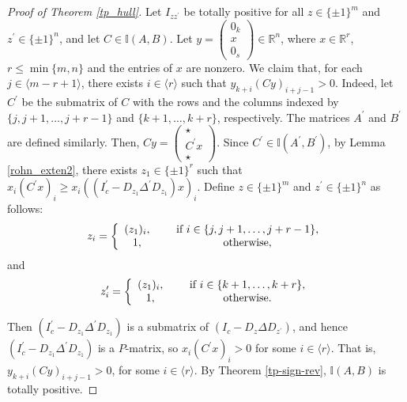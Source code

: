 \documentclass[11pt]{article}
\begin{document}
\begin{proof}[Proof of Theorem \ref{tp_hull}]
    Let $I_{z z^{'}}$ be totally positive for all $z\in \{ \pm 1 \}^m$ and $z^{\prime}\in \{ \pm 1 \}^n$, and let $C \in \mathbb{I}(A,B)$. Let $y = \begin{pmatrix}
    0_k\\x\\0_s
    \end{pmatrix} \in \mathbb{R}^n
    $, where $x \in \mathbb{R}^r$, $r\leq \min \{m,n\}$ and the entries of $x$ are nonzero. We claim that, for each $j \in \langle m-r+1 \rangle$, there exists $i \in \langle r \rangle$ such that $y_{k+i} (Cy)_{i+j-1} > 0.$
    Indeed, let $C^{\prime}$ be the  submatrix of $C$ with the rows and the columns indexed by $\{j, j+1, \dots, j+r-1\}$ and $\{k+1, \dots, k+r\}$, respectively. The matrices $A^{'}$ and $B^{'}$ are defined  similarly. Then, $Cy = \begin{pmatrix}
    \star\\ C^{\prime}x \\ \star \end{pmatrix}$. Since $C^{\prime}\in \mathbb{I}(A^{\prime},B^{\prime})$, by Lemma \ref{rohn_exten2}, there exists $z_1 \in \{ \pm 1 \}^r$ such that $x_i(C^{\prime}x)_i \geq x_i((I_c^{'} - D_{z_1}\Delta^{\prime}D_{z_1})x)_i$. Define $z \in \{ \pm 1 \}^m$ and $z^{\prime} \in \{ \pm 1 \}^n$  as follows:  \[
    z_i=\left\{
    \begin{array}{cc}
    (z_1)_i, &\hspace{5mm} \mbox{if } i \in \{j, j+1, \dots, j+r-1\},\\
    1, &\hspace{5mm} \mbox{otherwise},
    \end{array}
    \right.
    \] and
    \[
    z^{\prime}_i=\left\{
    \begin{array}{cc}
    (z_1)_i, &\hspace{5mm} \mbox{if } i \in \{k+1, \dots, k+r\},\\
    1, &\hspace{5mm} \mbox{otherwise}.
    \end{array}
    \right.
    \]

    Then $(I_c^{\prime} - D_{z_1}\Delta^{\prime}D_{z_1})$ is a submatrix of $(I_c - D_{z}\Delta D_{z^{\prime}})$, and hence
    $(I_c^{\prime} - D_{z_1}\Delta^{\prime}D_{z_1})$ is a $P$-matrix, so $x_i(C^{\prime}x)_i > 0$ for some $i\in \langle r \rangle$. That is, $y_{k+i} (Cy)_{i+j-1} > 0$, for some $i\in \langle r \rangle$. By Theorem \ref{tp-sign-rev}, $\mathbb{I}(A, B)$ is  totally positive.
\end{proof}
\end{document}
